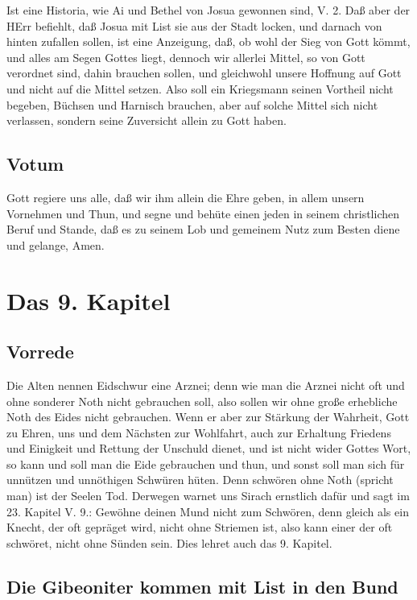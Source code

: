 Ist eine Historia, wie Ai und Bethel von Josua gewonnen sind, V. 2. Daß aber der HErr befiehlt, daß Josua mit List sie aus der Stadt locken, und darnach von hinten zufallen sollen, ist eine Anzeigung, daß, ob wohl der Sieg von Gott kömmt, und alles am Segen Gottes liegt, dennoch wir allerlei Mittel, so von Gott verordnet sind, dahin brauchen sollen, und gleichwohl unsere Hoffnung auf Gott und nicht auf die Mittel setzen. Also soll ein Kriegsmann seinen Vortheil nicht begeben, Büchsen und Harnisch brauchen, aber auf solche Mittel sich nicht verlassen, sondern seine Zuversicht allein zu Gott haben.

\section{Votum}

Gott regiere uns alle, daß wir ihm allein die Ehre geben, in allem unsern Vornehmen und Thun, und segne und behüte einen jeden in seinem christlichen Beruf und Stande, daß es zu seinem Lob und gemeinem Nutz zum Besten diene und gelange, Amen.

\chapter{Das 9. Kapitel}

\section{Vorrede}

Die Alten nennen Eidschwur eine Arznei; denn wie man die Arznei nicht oft und ohne sonderer Noth nicht gebrauchen soll, also sollen wir ohne große erhebliche Noth des Eides nicht gebrauchen. Wenn er aber zur Stärkung der Wahrheit, Gott zu Ehren, uns und dem Nächsten zur Wohlfahrt, auch zur Erhaltung Friedens und Einigkeit und Rettung der Unschuld dienet, und ist nicht wider Gottes Wort, so kann und soll man die Eide gebrauchen und thun, und sonst soll man sich für unnützen und unnöthigen Schwüren hüten. Denn schwören ohne Noth (spricht man) ist der Seelen Tod. Derwegen warnet uns Sirach ernstlich dafür und sagt im 23. Kapitel V. 9.: Gewöhne deinen Mund nicht zum Schwören, denn gleich als ein Knecht, der oft gepräget wird, nicht ohne Striemen ist, also kann einer der oft schwöret, nicht ohne Sünden sein. Dies lehret auch das 9. Kapitel.

\section{Die Gibeoniter kommen mit List in den Bund}
